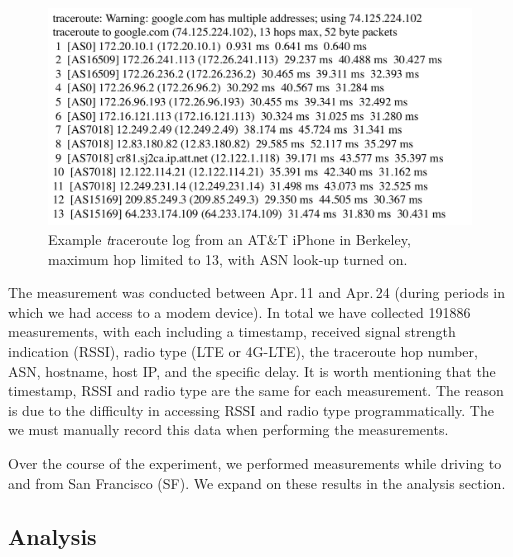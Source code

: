 \begin{figure}[!htb]
  \centering
  \includegraphics[width=1.1\linewidth]{../figs/traceroute.pdf}
  \vspace{-1em}
  \caption{Example {\textit traceroute} log from an AT\&T iPhone in Berkeley, maximum hop limited to 13, with ASN look-up turned on.}
  \label{fig:traceroute}
\end{figure}


The measurement was conducted between Apr.\,11 and Apr.\,24 (during periods in which we had access to a modem device). In total we have collected 191886 measurements, with each including a timestamp, received signal strength indication (RSSI), radio type (LTE or 4G-LTE), the traceroute hop number, ASN, hostname, host IP, and the specific delay. It is worth mentioning that the timestamp, RSSI and radio type are the same for each measurement. The reason is due to the difficulty in accessing RSSI and radio type programmatically. The we must manually record this data when performing the measurements.

Over the course of the experiment, we performed measurements while driving to and from San Francisco (SF). We expand on these results in the analysis section. 

\subsection{Analysis}
\label{sec:analysis}

